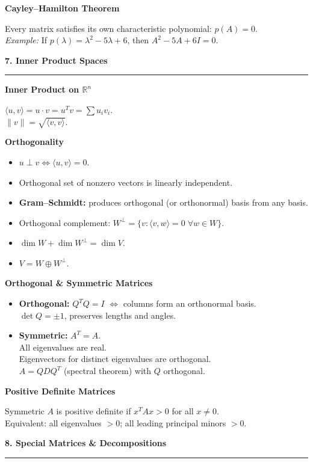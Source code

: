 \documentclass[10pt,twocolumn]{article}
\newcommand{\sect}[1]{\medskip\noindent\textbf{\large #1}\medskip\hrule\smallskip}
\newcommand{\subsect}[1]{\smallskip\noindent\textbf{#1}\par}
\begin{document}
\subsect{Cayley--Hamilton Theorem}
Every matrix satisfies its own characteristic polynomial: $p(A)=0$.\\
\textit{Example:} If $p(\lambda)=\lambda^2-5\lambda+6$, then $A^2-5A+6I=0$.

\sect{7. Inner Product Spaces}

\subsect{Inner Product on $\mathbb{R}^n$}
$\langle u,v\rangle = u\cdot v = u^Tv = \sum u_iv_i$.\\
$\|v\|=\sqrt{\langle v,v\rangle}$.

\subsect{Orthogonality}
\begin{itemize}[nosep,leftmargin=*]
\item $u\perp v \iff \langle u,v\rangle=0$.
\item Orthogonal set of nonzero vectors is linearly independent.
\item \textbf{Gram--Schmidt:} produces orthogonal (or orthonormal) basis from any basis.
\item Orthogonal complement: $W^\perp=\{v:\langle v,w\rangle=0\;\forall w\in W\}$.
\item $\dim W+\dim W^\perp=\dim V$.
\item $V=W\oplus W^\perp$.
\end{itemize}

\subsect{Orthogonal \& Symmetric Matrices}
\begin{itemize}[nosep,leftmargin=*]
\item \textbf{Orthogonal:} $Q^TQ=I$ $\iff$ columns form an orthonormal basis.\\
  $\det Q=\pm 1$, preserves lengths and angles.
\item \textbf{Symmetric:} $A^T=A$.\\
  All eigenvalues are real.\\
  Eigenvectors for distinct eigenvalues are orthogonal.\\
  $A=QDQ^T$ (spectral theorem) with $Q$ orthogonal.
\end{itemize}

\subsect{Positive Definite Matrices}
Symmetric $A$ is positive definite if $x^TAx>0$ for all $x\neq 0$.\\
Equivalent: all eigenvalues $>0$; all leading principal minors $>0$.

\sect{8. Special Matrices \& Decompositions}
\end{document}
